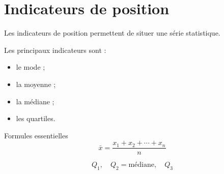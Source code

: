 \section{Indicateurs de position}

\begin{cadretheorie}
Les indicateurs de position permettent de situer une série statistique.

Les principaux indicateurs sont :
\begin{itemize}
    \item le mode ;
    \item la moyenne ;
    \item la médiane ;
    \item les quartiles.
\end{itemize}
\end{cadretheorie}

\begin{cadrevert}{Formules essentielles}
\[
\bar{x}=\frac{x_1+x_2+\cdots+x_n}{n}
\]

\[
Q_1,\quad Q_2=\text{médiane},\quad Q_3
\]
\end{cadrevert}